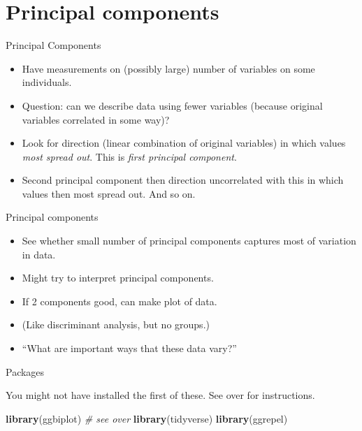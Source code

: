 \documentclass[ignorenonframetext,]{beamer}
\newenvironment{Shaded}{\begin{snugshade}}{\end{snugshade}}
\newcommand{\CommentTok}[1]{\textcolor[rgb]{0.56,0.35,0.01}{\textit{#1}}}
\newcommand{\KeywordTok}[1]{\textcolor[rgb]{0.13,0.29,0.53}{\textbf{#1}}}
\newcommand{\NormalTok}[1]{#1}
\begin{document}
\hypertarget{principal-components}{%
\section{Principal components}\label{principal-components}}

\begin{frame}{Principal Components}
\protect\hypertarget{principal-components-1}{}

\begin{itemize}
\item
  Have measurements on (possibly large) number of variables on some
  individuals.
\item
  Question: can we describe data using fewer variables (because original
  variables correlated in some way)?
\item
  Look for direction (linear combination of original variables) in which
  values \emph{most spread out}. This is \emph{first principal
  component}.
\item
  Second principal component then direction uncorrelated with this in
  which values then most spread out. And so on.
\end{itemize}

\end{frame}

\begin{frame}{Principal components}
\protect\hypertarget{principal-components-2}{}

\begin{itemize}
\item
  See whether small number of principal components captures most of
  variation in data.
\item
  Might try to interpret principal components.
\item
  If 2 components good, can make plot of data.
\item
  (Like discriminant analysis, but no groups.)
\item
  ``What are important ways that these data vary?''
\end{itemize}

\end{frame}

\begin{frame}[fragile]{Packages}
\protect\hypertarget{packages-9}{}

You might not have installed the first of these. See over for
instructions.

\begin{Shaded}
\begin{Highlighting}[]
\KeywordTok{library}\NormalTok{(ggbiplot) }\CommentTok{# see over}
\KeywordTok{library}\NormalTok{(tidyverse)}
\KeywordTok{library}\NormalTok{(ggrepel)}
\end{Highlighting}
\end{Shaded}

\end{frame}
\end{document}
